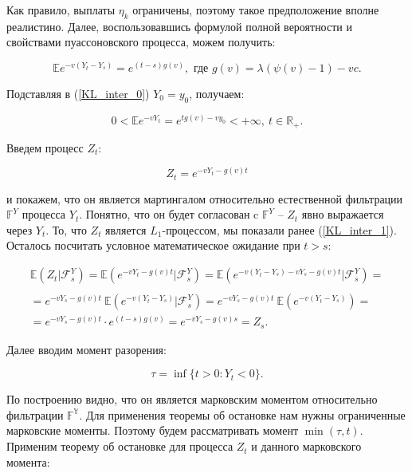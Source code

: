 \documentclass{article}
\theoremstyle{plain}
\theoremstyle{plain}
\theoremstyle{plain}
\theoremstyle{plain}
\theoremstyle{definition}
\theoremstyle{remark}
\begin{document}
Как правило, выплаты $\eta_k$ ограничены, поэтому такое предположение вполне реалистино. Далее, воспользовавшись формулой полной вероятности и свойствами пуассоновского процесса, можем получить:

\begin{equation}
\label{KL_inter_0}
    \mathbb{E} e^{-v(Y_t - Y_s)} = e^{(t - s)g(v)}, \text{ где } g(v) = \lambda(\psi(v) - 1) - vc.
\end{equation}

Подставляя в (\ref{KL_inter_0}) $Y_0 = y_0$, получаем:

\begin{equation}
\label{KL_inter_1}
    0 < \mathbb{E} e^{-v Y_t} = e^{t g(v) - v y_0} < + \infty,\ t \in \mathbb{R}_+.
\end{equation}


Введем процесс $Z_t$:

\begin{equation}
    Z_t = e^{-v Y_t - g(v) t}
\end{equation}

и покажем, что он является мартингалом относительно естественной фильтрации $\mathbb{F}^Y$ процесса $Y_t$. Понятно, что он будет согласован c $\mathbb{F}^Y$ -- $Z_t$ явно выражается через $Y_t$. То, что $Z_t$ является $L_1$-процессом, мы показали ранее (\ref{KL_inter_1}). Осталось посчитать условное математическое ожидание при $t > s$:

\begin{equation}
\begin{aligned}
    \mathbb{E} (Z_t | \mathcal{F}_s^Y) = \mathbb{E} (e^{-v Y_t - g(v) t} | \mathcal{F}_s^Y) = \mathbb{E} (e^{-v (Y_t - Y_s) - v Y_s - g(v) t} | \mathcal{F}_s^Y) = \\
    \\ = e^{- v Y_s - g(v) t}\ \mathbb{E} (e^{-v (Y_t - Y_s)} | \mathcal{F}_s^Y) = e^{- v Y_s - g(v) t}\ \mathbb{E} (e^{-v (Y_t - Y_s)}) = \\
    = e^{- v Y_s - g(v) t} \cdot e^{(t - s)g(v)} = e^{-v Y_s - g(v) s} = Z_s.
\end{aligned}
\end{equation}

Далее вводим момент разорения:

\begin{equation}
    \tau = \inf \{ t > 0 : Y_t < 0 \}.
\end{equation}

По построению видно, что он является марковским моментом относительно фильтрации $\mathbb{F^Y}$. Для применения теоремы об остановке нам нужны ограниченные марковские моменты. Поэтому будем рассматривать момент $\min (\tau, t)$. Применим теорему об остановке для процесса $Z_t$ и данного марковского момента:
\end{document}
